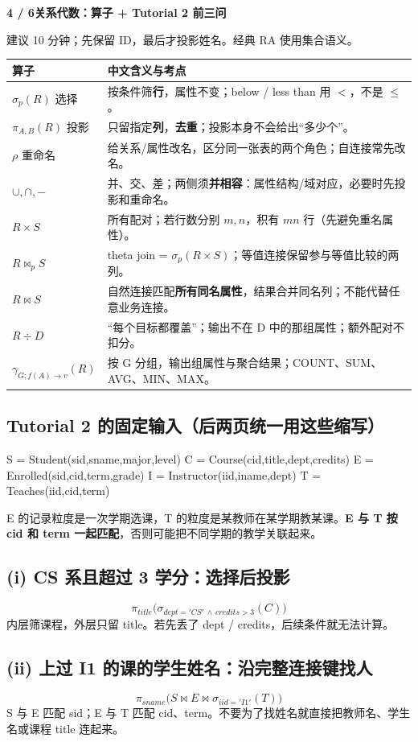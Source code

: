 \documentclass[11pt,a4paper]{article}
\newcommand{\stitle}[2]{{\sffamily\LARGE\bfseries\color{CUHKPurple}#1}\par{\small\color{Muted}#2}\par\vspace{3mm}}
\begin{document}
\clearpage
\stitle{4 / 6\quad 关系代数：算子 + Tutorial 2 前三问}{建议 10 分钟；先保留 ID，最后才投影姓名。经典 RA 使用集合语义。}
\begin{tabularx}{\linewidth}{@{}lX@{}}
\toprule 算子 & 中文含义与考点 \\
\midrule
$\sigma_p(R)$ 选择 & 按条件筛\textbf{行}，属性不变；below / less than 用 $<$，不是 $\le$。\\
$\pi_{A,B}(R)$ 投影 & 只留指定\textbf{列}，\textbf{去重}；投影本身不会给出“多少个”。\\
$\rho$ 重命名 & 给关系/属性改名，区分同一张表的两个角色；自连接常先改名。\\
$\cup,\cap,-$ & 并、交、差；两侧须\textbf{并相容}：属性结构/域对应，必要时先投影和重命名。\\
$R\times S$ & 所有配对；若行数分别 $m,n$，积有 $mn$ 行（先避免重名属性）。\\
$R\bowtie_p S$ & theta join = $\sigma_p(R\times S)$；等值连接保留参与等值比较的两列。\\
$R\bowtie S$ & 自然连接匹配\textbf{所有同名属性}，结果合并同名列；不能代替任意业务连接。\\
$R\div D$ & “每个目标都覆盖”；输出不在 D 中的那组属性；额外配对不扣分。\\
$\gamma_{G;f(A)\to v}(R)$ & 按 G 分组，输出组属性与聚合结果；COUNT、SUM、AVG、MIN、MAX。\\
\bottomrule
\end{tabularx}
\subsection{Tutorial 2 的固定输入（后两页统一用这些缩写）}
\begin{StudyCode}
S = Student(sid,sname,major,level)
C = Course(cid,title,dept,credits)
E = Enrolled(sid,cid,term,grade)
I = Instructor(iid,iname,dept)
T = Teaches(iid,cid,term)
\end{StudyCode}
E 的记录粒度是一次学期选课，T 的粒度是某教师在某学期教某课。\textbf{E 与 T 按 cid 和 term 一起匹配}，否则可能把不同学期的教学关联起来。

\subsection{(i) CS 系且超过 3 学分：选择后投影}
\[
\boxed{\pi_{title}\bigl(\sigma_{dept='CS'\,\land\,credits>3}(C)\bigr)}
\]
内层筛课程，外层只留 title。若先丢了 dept / credits，后续条件就无法计算。

\subsection{(ii) 上过 I1 的课的学生姓名：沿完整连接键找人}
\[
\boxed{\pi_{sname}\bigl(S\bowtie E\bowtie\sigma_{iid='I1'}(T)\bigr)}
\]
S 与 E 匹配 sid；E 与 T 匹配 cid、term。不要为了找姓名就直接把教师名、学生名或课程 title 连起来。
\end{document}
